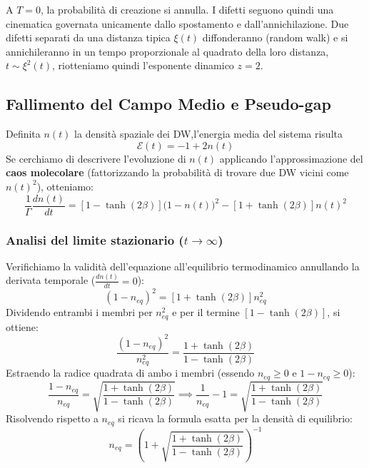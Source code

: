 A $T=0$, la probabilità di creazione si annulla. I difetti seguono quindi una cinematica governata unicamente dallo spostamento e dall'annichilazione. Due difetti separati da una distanza tipica $\xi(t)$ diffonderanno (random walk) e si annichileranno in un tempo proporzionale al quadrato della loro distanza, $t \sim \xi^2(t)$, riotteniamo quindi l'esponente dinamico $z=2$.


\subsection{Fallimento del Campo Medio e Pseudo-gap}
Definita $n(t)$ la densità spaziale dei DW,l'energia media del sistema risulta 
\begin{equation}
    \mathcal{E}(t) = -1 + 2n(t) 
\end{equation}
Se cerchiamo di descrivere l'evoluzione di $n(t)$ applicando l'approssimazione del \textbf{caos molecolare} (fattorizzando la probabilità di trovare due DW vicini come $n(t)^2$), otteniamo:
\begin{equation}
    \frac{1}{\Gamma}\frac{dn(t)}{dt} = [1 - \tanh(2\beta)] \big(1 - n(t)\big)^2 - [1 + \tanh(2\beta)] n(t)^2
\end{equation}
\subsubsection*{Analisi del limite stazionario ($t \to \infty$)}
Verifichiamo la validità dell'equazione all'equilibrio termodinamico annullando la derivata temporale ($\frac{dn(t)}{dt} = 0$):
\begin{equation}
    [1 - \tanh(2\beta)] (1 - n_{eq})^2 = [1 + \tanh(2\beta)] n_{eq}^2
\end{equation}
Dividendo entrambi i membri per $n_{eq}^2$ e per il termine $[1 - \tanh(2\beta)]$, si ottiene:
\begin{equation}
    \frac{(1 - n_{eq})^2}{n_{eq}^2} = \frac{1 + \tanh(2\beta)}{1 - \tanh(2\beta)}
\end{equation}
Estraendo la radice quadrata di ambo i membri (essendo $n_{eq} \ge 0$ e $1-n_{eq} \ge 0$):
\begin{equation}
    \frac{1 - n_{eq}}{n_{eq}} = \sqrt{\frac{1 + \tanh(2\beta)}{1 - \tanh(2\beta)}} \implies \frac{1}{n_{eq}} - 1 = \sqrt{\frac{1 + \tanh(2\beta)}{1 - \tanh(2\beta)}}
\end{equation}
Risolvendo rispetto a $n_{eq}$ si ricava la formula esatta per la densità di equilibrio:
\begin{equation}
    n_{eq} = \left( 1 + \sqrt{\frac{1 + \tanh(2\beta)}{1 - \tanh(2\beta)}} \right)^{-1}
\end{equation}

